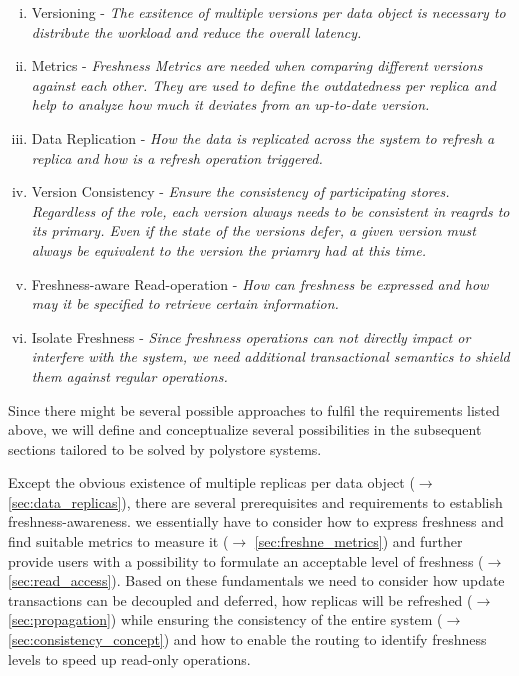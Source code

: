 \begin{enumerate}[(i)]
    \item Versioning -                      \textit{The exsitence of multiple versions per data object is necessary to distribute the workload 
                                            and reduce the overall latency.}

    \item Metrics -                         \textit{Freshness Metrics are needed when comparing different versions against each other.
                                            They are used to define the outdatedness per replica and help to analyze how much it deviates from an up-to-date version.}

    \item Data Replication -                \textit{How the data is replicated across the system to refresh a replica and how is a refresh operation triggered.}

    \item Version Consistency -             \textit{Ensure the consistency of participating stores. Regardless of the role, each version always needs 
                                            to be consistent in reagrds to its primary. Even if the state of the versions defer, 
                                            a given version must always be equivalent to the version the priamry had at this time.}
                                            
    \item Freshness-aware Read-operation -  \textit{How can freshness be expressed and how may it be specified to retrieve certain information.}
    
    \item Isolate Freshness -               \textit{Since freshness operations can not directly impact or interfere with the system, 
                                            we need additional transactional semantics to shield them against regular operations.}                                    

\end{enumerate}

Since there might be several possible approaches to fulfil the requirements listed above, 
we will define and conceptualize several possibilities in the subsequent sections tailored to be solved by polystore systems. 


Except the obvious existence of multiple replicas per data object ($\rightarrow$ \ref{sec:data_replicas}), 
there are several prerequisites and requirements to establish freshness-awareness. 
we essentially have to consider how to express freshness and find suitable metrics to measure it ($\rightarrow$ \ref{sec:freshne_metrics})
and further provide users with a possibility to formulate an acceptable level of freshness ($\rightarrow$ \ref{sec:read_access}). 
Based on these fundamentals we need to consider how update transactions can be decoupled and deferred, how replicas will be 
refreshed ($\rightarrow$ \ref{sec:propagation}) while ensuring the consistency of the entire system ($\rightarrow$ \ref{sec:consistency_concept}) and 
how to enable the routing to identify freshness levels to speed up read-only operations. 


